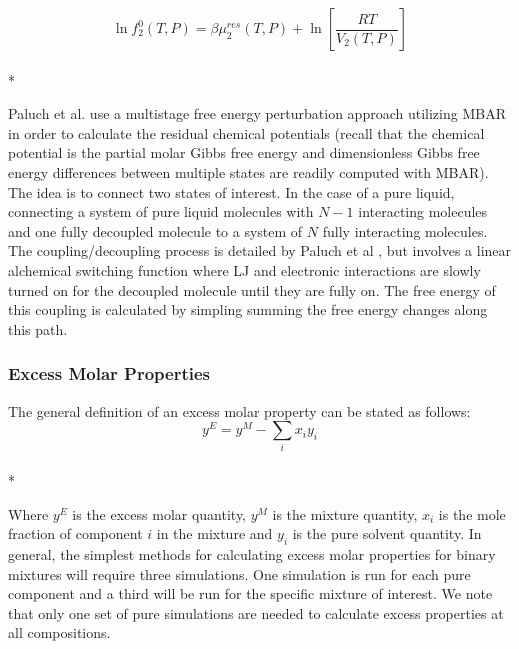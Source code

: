 \documentclass[9pt,bestpractices]{livecoms}
\begin{document}
\begin{equation}\ln f_2^0\left(T,P\right) = \beta\mu_2^{res}\left(T,P\right) + \ln\left[\frac{R T}{V_2\left(T,P\right)}\right]\end{equation}\\*

Paluch et al. use a multistage free energy perturbation approach utilizing MBAR in order to calculate the residual chemical potentials (recall that the chemical potential is the partial molar Gibbs free energy and dimensionless Gibbs free energy differences between multiple states are readily computed with MBAR). The idea is to connect two states of interest. In the case of a pure liquid, connecting a system of pure liquid molecules with $N - 1$ interacting molecules and one fully decoupled molecule to a system of $N$ fully interacting molecules. The coupling/decoupling process is detailed by Paluch et al \cite{paluch0}, but involves a linear alchemical switching function where LJ and electronic interactions are slowly turned on for the decoupled molecule until they are fully on. The free energy of this coupling is calculated by simpling summing the free energy changes along this path.     


\subsubsection{Excess Molar Properties}
The general definition of an excess molar property can be stated as follows:
\begin{equation}y^{E} = y^{M} - \sum_{i} x_i y_i\end{equation}\\*

Where $y^E$ is the excess molar quantity, $y^M$ is the mixture quantity, $x_i$ is the mole fraction of component $i$ in the mixture and $y_i$ is the pure solvent quantity. In general, the simplest methods for calculating excess molar properties for binary mixtures will require three simulations. One simulation is run for each pure component and a third will be run for the specific mixture of interest.
We note that only one set of pure simulations are needed to calculate excess properties at all compositions.

\end{document}
